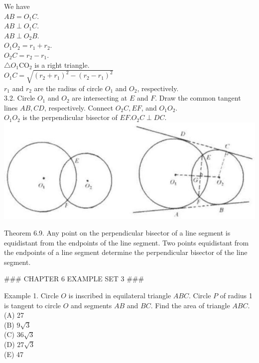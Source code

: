 \documentclass[10pt]{article}
\begin{document}
We have\\
\(A B=O_{1} C\).\\
\(A B \perp O_{1} C\).\\
\(A B \perp O_{2} B\).\\
\(O_{1} O_{2}=r_{1}+r_{2}\).\\
\(O_{2} C=r_{2}-r_{1}\).\\
\(\triangle O_{1} \mathrm{CO}_{2}\) is a right triangle.\\
\(O_{1} C=\sqrt{\left(r_{2}+r_{1}\right)^{2}-\left(r_{2}-r_{1}\right)^{2}}\)\\
\(r_{1}\) and \(r_{2}\) are the radius of circle \(O_{1}\) and \(O_{2}\), respectively.\\
3.2. Circle \(O_{1}\) and \(O_{2}\) are intersecting at \(E\) and \(F\). Draw the common tangent lines \(A B, C D\), respectively. Connect \(O_{2} C, E F\), and \(O_{1} O_{2}\).\\
\(O_{1} O_{2}\) is the perpendicular bisector of \(E F . O_{2} C \perp D C\).\\
\includegraphics[max width=\textwidth, center]{2025_04_17_97bc1f7e44d93c271a88g-175}

Theorem 6.9. Any point on the perpendicular bisector of a line segment is equidistant from the endpoints of the line segment. Two points equidistant from the endpoints of a line segment determine the perpendicular bisector of the line segment.


### CHAPTER 6 EXAMPLE SET 3 ###

Example 1. Circle \(O\) is inscribed in equilateral triangle \(A B C\). Circle \(P\) of radius 1 is tangent to circle \(O\) and segments \(A B\) and \(B C\). Find the area of triangle \(A B C\).\\
(A) 27\\
(B) \(9 \sqrt{3}\)\\
(C) \(36 \sqrt{3}\)\\
(D) \(27 \sqrt{3}\)\\
(E) 47
\end{document}
